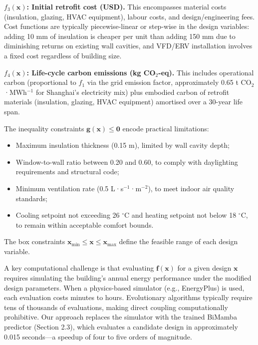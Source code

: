 \documentclass[11pt]{article}
\newcommand{\degree}{\ensuremath{^\circ}}
\begin{document}
\textbf{$f_3(\mathbf{x})$: Initial retrofit cost (USD).} This encompasses material costs (insulation, glazing, HVAC equipment), labour costs, and design/engineering fees. Cost functions are typically piecewise-linear or step-wise in the design variables: adding 10 mm of insulation is cheaper per unit than adding 150 mm due to diminishing returns on existing wall cavities, and VFD/ERV installation involves a fixed cost regardless of building size.

\textbf{$f_4(\mathbf{x})$: Life-cycle carbon emissions (kg CO$_2$-eq).} This includes operational carbon (proportional to $f_1$ via the grid emission factor, approximately 0.65 t CO$_2$·MWh$^{-1}$ for Shanghai's electricity mix) plus embodied carbon of retrofit materials (insulation, glazing, HVAC equipment) amortised over a 30-year life span.

The inequality constraints $\mathbf{g}(\mathbf{x}) \leq \mathbf{0}$ encode practical limitations:
\begin{itemize}
    \item Maximum insulation thickness (0.15 m), limited by wall cavity depth;
    \item Window-to-wall ratio between 0.20 and 0.60, to comply with daylighting requirements and structural code;
    \item Minimum ventilation rate (0.5 L·s$^{-1}$·m$^{-2}$), to meet indoor air quality standards;
    \item Cooling setpoint not exceeding 26 \degree C and heating setpoint not below 18 \degree C, to remain within acceptable comfort bounds.
\end{itemize}

The box constraints $\mathbf{x}_{\text{min}} \leq \mathbf{x} \leq \mathbf{x}_{\text{max}}$ define the feasible range of each design variable.

A key computational challenge is that evaluating $\mathbf{f}(\mathbf{x})$ for a given design $\mathbf{x}$ requires simulating the building's annual energy performance under the modified design parameters. When a physics-based simulator (e.g., EnergyPlus) is used, each evaluation costs minutes to hours. Evolutionary algorithms typically require tens of thousands of evaluations, making direct coupling computationally prohibitive. Our approach replaces the simulator with the trained BiMamba predictor (Section 2.3), which evaluates a candidate design in approximately 0.015 seconds---a speedup of four to five orders of magnitude.
\end{document}
